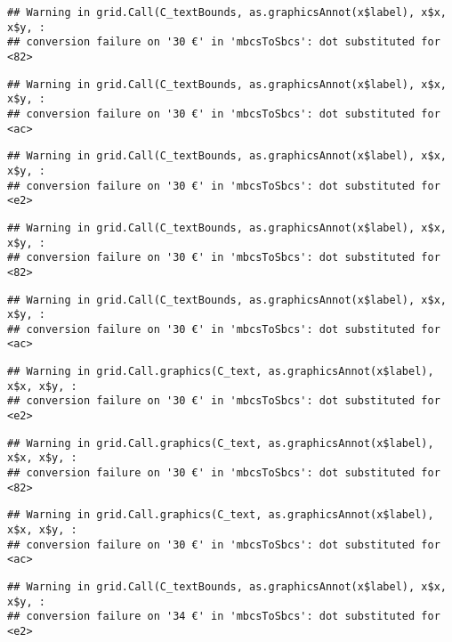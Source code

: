 \documentclass[
]{article}
\begin{document}
\begin{verbatim}
## Warning in grid.Call(C_textBounds, as.graphicsAnnot(x$label), x$x, x$y, :
## conversion failure on '30 €' in 'mbcsToSbcs': dot substituted for <82>
\end{verbatim}

\begin{verbatim}
## Warning in grid.Call(C_textBounds, as.graphicsAnnot(x$label), x$x, x$y, :
## conversion failure on '30 €' in 'mbcsToSbcs': dot substituted for <ac>
\end{verbatim}

\begin{verbatim}
## Warning in grid.Call(C_textBounds, as.graphicsAnnot(x$label), x$x, x$y, :
## conversion failure on '30 €' in 'mbcsToSbcs': dot substituted for <e2>
\end{verbatim}

\begin{verbatim}
## Warning in grid.Call(C_textBounds, as.graphicsAnnot(x$label), x$x, x$y, :
## conversion failure on '30 €' in 'mbcsToSbcs': dot substituted for <82>
\end{verbatim}

\begin{verbatim}
## Warning in grid.Call(C_textBounds, as.graphicsAnnot(x$label), x$x, x$y, :
## conversion failure on '30 €' in 'mbcsToSbcs': dot substituted for <ac>
\end{verbatim}

\begin{verbatim}
## Warning in grid.Call.graphics(C_text, as.graphicsAnnot(x$label), x$x, x$y, :
## conversion failure on '30 €' in 'mbcsToSbcs': dot substituted for <e2>
\end{verbatim}

\begin{verbatim}
## Warning in grid.Call.graphics(C_text, as.graphicsAnnot(x$label), x$x, x$y, :
## conversion failure on '30 €' in 'mbcsToSbcs': dot substituted for <82>
\end{verbatim}

\begin{verbatim}
## Warning in grid.Call.graphics(C_text, as.graphicsAnnot(x$label), x$x, x$y, :
## conversion failure on '30 €' in 'mbcsToSbcs': dot substituted for <ac>
\end{verbatim}

\begin{verbatim}
## Warning in grid.Call(C_textBounds, as.graphicsAnnot(x$label), x$x, x$y, :
## conversion failure on '34 €' in 'mbcsToSbcs': dot substituted for <e2>
\end{verbatim}
\end{document}
